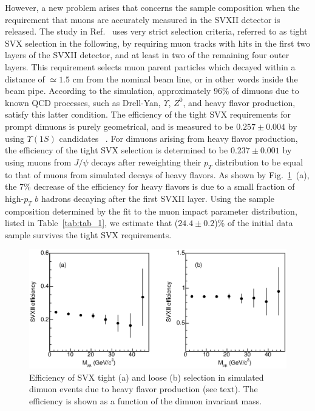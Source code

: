 \documentclass[aps,prd,preprint,floatfix,nofootinbib,superscriptaddress,showpacs,amssymb]{revtex4}
\begin{document}
 However, a new problem arises that concerns the sample composition when
 the requirement that muons are accurately measured in the SVXII detector
 is released.
 The study in Ref.~\cite{bbxs} uses very strict selection criteria, referred to as
 tight SVX selection in the following, by requiring muon tracks with hits
 in the first two layers of the SVXII detector, and at least in two of 
 the remaining four outer layers. This requirement selects muon parent
 particles which decayed within a distance of $\simeq 1.5$ cm from the
 nominal beam line, or in other words inside the beam pipe. According
 to the simulation, approximately 96\% of dimuons due to known QCD
 processes, such as Drell-Yan, $\Upsilon$, $Z^0$, and heavy flavor 
 production, satisfy this latter condition. The efficiency of the tight
 SVX requirements for prompt dimuons is purely geometrical, and is
 measured to be $0.257 \pm 0.004$ by using $\Upsilon(1S)$ candidates
 ~\cite{bbxs}. For dimuons arising from heavy flavor production, the
 efficiency of the tight SVX selection is determined to be
 $0.237 \pm0.001$ by using muons from $J/\psi$ decays after reweighting
 their $p_T$ distribution to be equal to that of muons from simulated
 decays of heavy flavors. As shown by  Fig.~\ref{fig:fig_1}~(a), the
 7\% decrease of the efficiency for heavy flavors is due to a small 
 fraction of high-$p_T$ $b$ hadrons decaying after the first SVXII layer.
 Using the sample composition determined by the fit to the muon impact
 parameter distribution, listed in Table~\ref{tab:tab_1}, we estimate 
 that ($24.4 \pm 0.2$)\% of the initial data sample survives the tight
 SVX requirements.
 \begin{figure}
 \begin{center}
 \vspace{-0.3in}
 \leavevmode
 \includegraphics*[width=\textwidth]{fa0_1.eps}
 \caption[]{Efficiency of SVX tight (a) and loose (b) selection in simulated
            dimuon events due to heavy flavor production (see text). The 
            efficiency is shown as a function of the dimuon invariant mass.}
 \label{fig:fig_1}
 \end{center}
 \end{figure}
\end{document}
